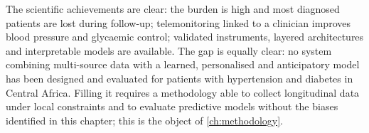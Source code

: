 The scientific achievements are clear: the burden is high and most diagnosed patients are lost during follow-up; telemonitoring linked to a clinician improves blood pressure and glycaemic control; validated instruments, layered architectures and interpretable models are available. The gap is equally clear: no system combining multi-source data with a learned, personalised and anticipatory model has been designed and evaluated for patients with hypertension and diabetes in Central Africa. Filling it requires a methodology able to collect longitudinal data under local constraints and to evaluate predictive models without the biases identified in this chapter; this is the object of \cref{ch:methodology}.
